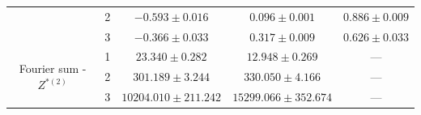 \begin{table}[ht]
{\begin{tabular}{ccccc}
                                                                                   & 2                                    & $-0.593 \pm 0.016$ & $0.096 \pm 0.001$ & $0.886 \pm 0.009$ \\
                                                                                   & 3                                    & $-0.366 \pm 0.033$ & $0.317 \pm 0.009$ & $0.626 \pm 0.033$ \\ \hline
    \multirow{3}{*}{Fourier sum - $Z^{*(2)}$}                                      & 1                                    & $23.340 \pm 0.282$ & $12.948 \pm 0.269$ & ---             \\
                                                                                   & 2                                    & $301.189 \pm 3.244$ & $330.050 \pm 4.166$ & ---             \\
                                                                                   & 3                                    & $10204.010 \pm 211.242$ & $15299.066 \pm 352.674$ & ---             \\ \hline
    \end{tabular}
    }
    \label{table:emis_dists_CarHHMM-DFT}
\end{table}


